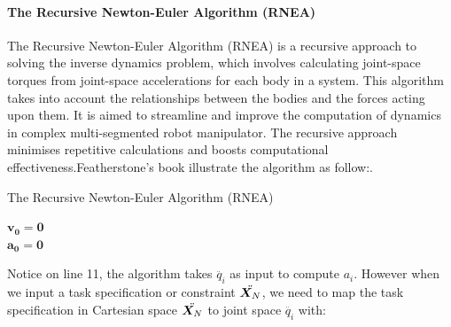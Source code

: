 \documentclass[report.tex]{subfiles}
\begin{document}
    \paragraph*{\large{The Recursive Newton-Euler Algorithm (RNEA)}\\}
    The Recursive Newton-Euler Algorithm (RNEA) is a recursive approach to solving the inverse dynamics problem, which involves calculating joint-space torques from joint-space accelerations for each body in a system. This algorithm takes into account the relationships between the bodies and the forces acting upon them. It is aimed to streamline and improve the computation of dynamics in complex multi-segmented robot manipulator. The recursive approach minimises repetitive calculations and boosts computational effectiveness.Featherstone's book illustrate the algorithm as follow:\cite{featherstone2007book}.\\
    \begin{algorithm}[H]
        \caption{The Recursive Newton-Euler Algorithm (RNEA)}
        \label{alg:ALG1}
        $\bm{v_0 = 0}$\\
        $\bm{a_0 = 0}$\\
    \end{algorithm}
    Notice on line 11, the algorithm takes $\ddot{q_i}$ as input to compute $a_i$. However when we input a task specification or constraint $\ddot{\bm{X_}N}$, we need to map the task specification in Cartesian space $\ddot{\bm{X_}N}$ to joint space $\ddot{q_i}$ with:
\end{document}
